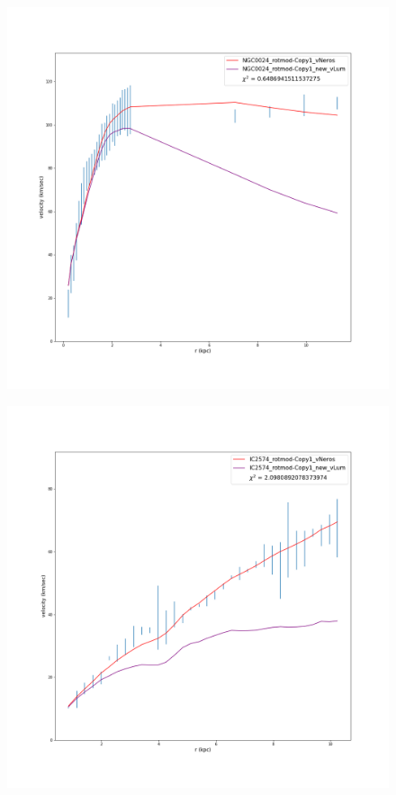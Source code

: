 \documentclass[reprint,%
 amsmath,amssymb,
 aps,
]{revtex4-1}
\begin{document}
\begin{figure}
\begin{minipage}{.5\textwidth}
  \includegraphics[width=.95\linewidth]{Updated_Graphs_withnewcolorsandfonts/NGC0024_rotmod-Copy1_XueSofue.png}
  \label{fig:test2}
\end{minipage}
\begin{minipage}{.5\textwidth}
  \centering
  \includegraphics[width=.95\linewidth]{Updated_Graphs_withnewcolorsandfonts/IC2574_rotmod-Copy1_XueSofue.png}

\end{minipage}
\end{figure}
\end{document}
